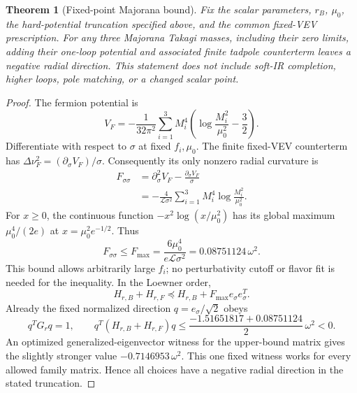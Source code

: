 \documentclass[11pt]{article}
\newcommand{\LOOP}{\mathcal L}
\newtheorem{theorem}{Theorem}
\begin{document}
\begin{theorem}[Fixed-point Majorana bound]
Fix the scalar parameters, $r_B$, $\mu_0$, the hard-potential truncation
specified above, and the common fixed-VEV prescription. For any three
Majorana Takagi masses, including their zero limits, adding their
one-loop potential and associated finite tadpole counterterm leaves a
negative radial direction. This statement does not include soft-IR
completion, higher loops, pole matching, or a changed scalar point.
\end{theorem}
\begin{proof}
The fermion potential is
\begin{equation}
 V_F=-\frac1{32\pi^2}\sum_{i=1}^3M_i^4
        \left(\log\frac{M_i^2}{\mu_0^2}-\frac32\right).
\end{equation}
Differentiate with respect to $\sigma$ at fixed $f_i,\mu_0$. The finite
fixed-VEV counterterm has $\Delta\nu_F^2=(\partial_\sigma V_F)/\sigma$.
Consequently its only nonzero radial curvature is
\begin{align}
 F_{\sigma\sigma}
 &=\partial_\sigma^2V_F-\frac{\partial_\sigma V_F}{\sigma}\\
 &=-\frac4{\LOOP\sigma^2}\sum_{i=1}^3M_i^4
                        \log\frac{M_i^2}{\mu_0^2}.
 \label{eq:fermioncurvature}
\end{align}
For $x\geq0$, the continuous function $-x^2\log(x/\mu_0^2)$ has its global
maximum $\mu_0^4/(2e)$ at $x=\mu_0^2e^{-1/2}$. Thus
\begin{equation}
 F_{\sigma\sigma}\leq
 F_{\max}=\frac{6\mu_0^4}{e\LOOP\sigma^2}
          =0.08751124\,\omega^2.
 \label{eq:fermioncap}
\end{equation}
This bound allows arbitrarily large $f_i$; no perturbativity cutoff or
flavor fit is needed for the inequality. In the Loewner order,
\begin{equation}
 H_{r,B}+H_{r,F}\preceq H_{r,B}+F_{\max}e_\sigma e_\sigma^T.
\end{equation}
Already the fixed normalized direction $q=e_\sigma/\sqrt2$ obeys
\begin{equation}
 q^TG_rq=1,\qquad
 q^T(H_{r,B}+H_{r,F})q
 \leq\frac{-1.51651817+0.08751124}{2}\,\omega^2<0.
\end{equation}
An optimized generalized-eigenvector witness for the upper-bound matrix
gives the slightly stronger value $-0.7146953\,\omega^2$. This one fixed
witness works for every allowed family matrix. Hence all choices have
a negative radial direction in the stated truncation.
\end{proof}
\end{document}
